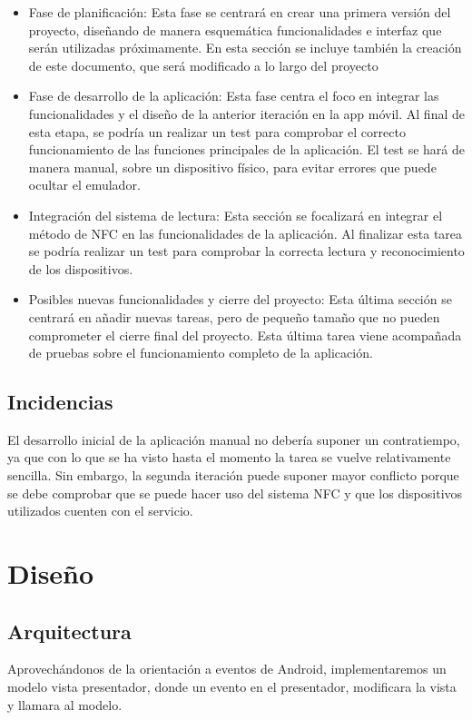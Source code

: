 \documentclass[a4paper,openright,12pt]{article}
\begin{document}
\begin{itemize}
\item{Fase de planificación: Esta fase se centrará en crear una primera versión del proyecto, diseñando de manera esquemática funcionalidades e interfaz que serán utilizadas próximamente. En esta sección se incluye también la creación de este documento, que será modificado a lo largo del proyecto}
\item{Fase de desarrollo de la aplicación: Esta fase centra el foco en integrar las funcionalidades y el diseño de la anterior iteración en la app móvil. Al final de esta etapa, se podría un realizar un test para comprobar el correcto funcionamiento de las funciones principales de la aplicación. El test se hará de manera manual, sobre un dispositivo físico, para evitar errores que puede ocultar el emulador.}
\item{Integración del sistema de lectura: Esta sección se focalizará en integrar el método de NFC en las funcionalidades de la aplicación. Al finalizar esta tarea se podría realizar un test para comprobar la correcta lectura y reconocimiento de los dispositivos.}
\item{Posibles nuevas funcionalidades y cierre del proyecto: Esta última sección se centrará en añadir nuevas tareas, pero de pequeño tamaño que no pueden comprometer el cierre final del proyecto. Esta última tarea viene acompañada de pruebas sobre el funcionamiento completo de la aplicación.}
\end{itemize}

\subsection{Incidencias}
El desarrollo inicial de la aplicación manual no debería suponer un contratiempo, ya que con lo que se ha visto hasta el momento la tarea se vuelve relativamente sencilla. Sin embargo, la segunda iteración puede suponer mayor conflicto porque se debe comprobar que se puede hacer uso del sistema NFC y que los dispositivos utilizados cuenten con el servicio.


\section{Diseño}
\subsection{Arquitectura}
Aprovechándonos de la orientación a eventos de Android, implementaremos un modelo vista presentador, donde un evento en el presentador, modificara la vista y llamara al modelo.
\end{document}
